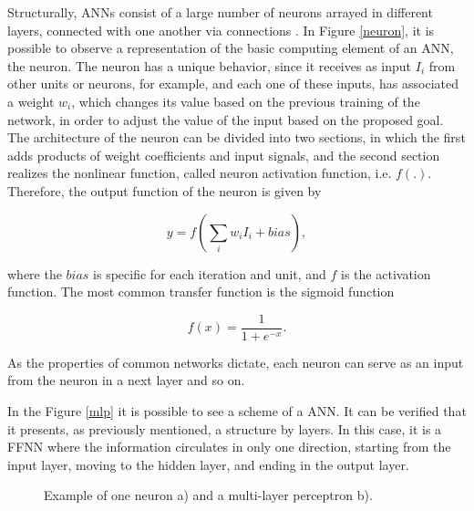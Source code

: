 Structurally, \ac{ANN}s consist of a large number of neurons arrayed in different layers, connected with one another via connections \cite{review2017}. In Figure \ref{neuron}, it is possible to observe a representation of the basic computing element of an \ac{ANN}, the neuron. 
The neuron has a unique behavior, since it receives as input $I_i$ from other units or neurons, for example, and each one of these inputs, has associated a weight $w_i$, which changes its value based on the previous training of the network, in order to adjust the value of the input based on the proposed goal. The architecture of the neuron can be divided into two sections, in which the first adds products of weight coefficients and input signals, and the second section realizes the nonlinear function, called neuron activation function, i.e. $f(.)$. Therefore, the output function of the neuron is given by \cite{ann1}

\begin{equation}
   y = f(\sum_i w_i I_i + bias), 
   \label{tauequation}
\end{equation}

where the $bias$ is specific for each iteration and unit, and $f$ is the activation function. The most common transfer function is the sigmoid function \cite{ann1}

\begin{equation}
   f(x) = \frac{1}{1+e^{-x}}.
   \label{fequation}
\end{equation}

As the properties of common networks dictate, each neuron can serve as an input from the neuron in a next layer and so on.

In the Figure \ref{mlp} it is possible to see a scheme of a \ac{ANN}. It can be verified that it presents, as previously mentioned, a structure by layers. In this case, it is a \ac{FFNN} where the information circulates in only one direction, starting from the input layer, moving to the hidden layer, and ending in the output layer. 



\begin{figure}[h!]
\captionsetup[subfigure]{position=b}
\centering
{}
\hspace{0.05\textwidth}
\caption{Example of one neuron a) and a multi-layer perceptron b).}
\end{figure}

